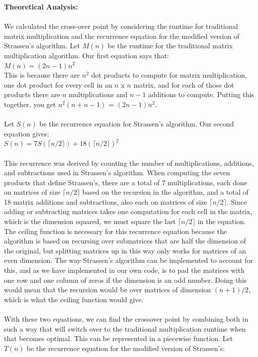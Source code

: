 \documentclass[11pt]{article}
\begin{document}
\textbf{Theoretical Analysis:} \\\\
We calculated the cross-over point by considering the runtime for traditional matrix multiplication and the recurrence equation for the modified version of Strassen's algorithm. Let $M(n)$ be the runtime for the traditional matrix multiplication algorithm. Our first equation says that: \\
$M(n) = (2n - 1)n^2$ \\
This is because there are $n^2$ dot products to compute for matrix multiplication, one dot product for every cell in an $n$ x $n$ matrix, and for each of those dot products there are $n$ multiplications and $n - 1$ additions to compute. Putting this together, you get $n^2(n + n - 1)$ = $(2n - 1)n^2$. \\\\
Let $S(n)$ be the recurrence equation for Strassen's algorithm. Our second equation gives: \\
$S(n) = 7S(\lceil n/2\rceil) + 18(\lceil n/2 \rceil)^2$ \\\\
This recurrence was derived by counting the number of multiplications, additions, and subtractions used in Strassen's algorithm. When computing the seven products that define Strassen's, there are a total of 7 multiplications, each done on matrices of size $\lceil n/2 \rceil$ based on the recursion in the algorithm, and a total of 18 matrix additions and subtractions, also each on matrices of size $\lceil n/2 \rceil$. Since adding or subtracting matrices takes one computation for each cell in the matrix, which is the dimension squared, we must square the last $\lceil n/2 \rceil$ in the equation. The ceiling function is necessary for this recurrence equation because the algorithm is based on recursing over submatrices that are half the dimension of the original, but splitting matrices up in this way only works for matrices of an even dimension. The way Strassen's algorithm can be implemented to account for this, and as we have implemented in our own code, is to pad the matrices with one row and one column of zeros if the dimension is an odd number. Doing this would mean that the recursion would be over matrices of dimension $(n + 1)/2$, which is what the ceiling function would give. \\\\
With these two equations, we can find the crossover point by combining both in such a way that will switch over to the traditional multiplication runtime when that becomes optimal. This can be represented in a piecewise function. Let $T(n)$ be the recurrence equation for the modified version of Strassen's: \\
\end{document}
